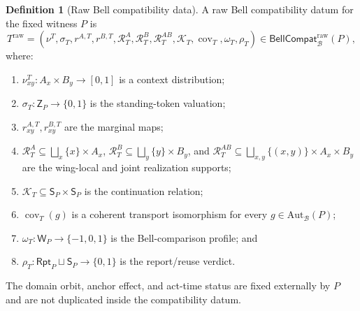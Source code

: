 \documentclass[11pt]{article}
\theoremstyle{definition}
\newtheorem{definition}[theorem]{Definition}
\newcommand{\Bell}{\mathcal{B}}
\newcommand{\AutBell}{\mathrm{Aut}_{\Bell}(P)}
\newcommand{\BellCompatRaw}{\mathsf{BellCompat}^{\mathrm{raw}}_{\Bell}(P)}
\begin{document}
\begin{definition}[Raw Bell compatibility data]\label{def:tensorcompat}
A raw Bell compatibility datum for the fixed witness $P$ is
\[
T^{\mathrm{raw}}=(\nu^T,\sigma_T,r^{A,T},r^{B,T},\mathcal R_T^A,\mathcal R_T^B,
\mathcal R_T^{AB},\mathcal K_T,\operatorname{cov}_T,\omega_T,\rho_T)\in\BellCompatRaw,
\]
where:
\begin{enumerate}[label=(R\arabic*),leftmargin=3em]
\item $\nu^T_{xy}:A_x\times B_y\to[0,1]$ is a context distribution;
\item $\sigma_T:\mathsf Z_P\to\{0,1\}$ is the standing-token valuation;
\item $r^{A,T}_{xy},r^{B,T}_{xy}$ are the marginal maps;
\item $\mathcal R_T^A\subseteq\bigsqcup_x\{x\}\times A_x$, $\mathcal R_T^B\subseteq\bigsqcup_y\{y\}\times B_y$, and $\mathcal R_T^{AB}\subseteq\bigsqcup_{x,y}\{(x,y)\}\times A_x\times B_y$ are the wing-local and joint realization supports;
\item $\mathcal K_T\subseteq\mathsf S_P\times\mathsf S_P$ is the continuation relation;
\item $\operatorname{cov}_T(g)$ is a coherent transport isomorphism for every $g\in\AutBell$;
\item $\omega_T:\mathsf W_P\to\{-1,0,1\}$ is the Bell-comparison profile; and
\item $\rho_T:\mathsf{Rpt}_P\sqcup\mathsf S_P\to\{0,1\}$ is the report/reuse verdict.
\end{enumerate}
The domain orbit, anchor effect, and act-time status are fixed externally by $P$ and are not duplicated inside the compatibility datum.
\end{definition}
\end{document}
